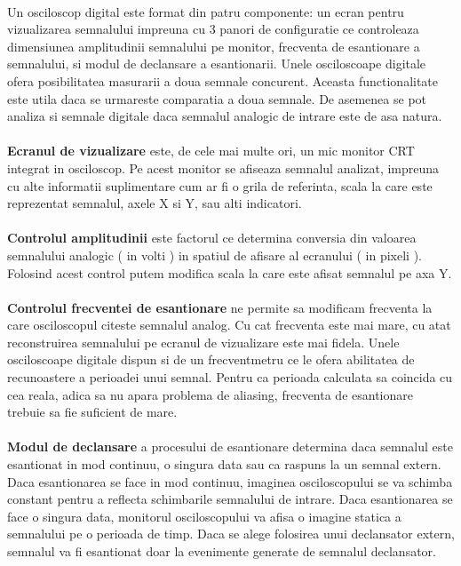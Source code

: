 \paragraph{}
Un osciloscop digital este format din patru componente: un ecran pentru vizualizarea semnalului impreuna cu 3 panori de configuratie ce controleaza dimensiunea amplitudinii semnalului pe monitor, frecventa de esantionare a semnalului, si modul de declansare a esantionarii. Unele osciloscoape digitale ofera posibilitatea masurarii a doua semnale concurent. Aceasta functionalitate este utila daca se urmareste comparatia a doua semnale. De asemenea se pot analiza si semnale digitale daca semnalul analogic de intrare este de asa natura.

\paragraph{}
{\bf Ecranul de vizualizare} este, de cele mai multe ori, un mic monitor CRT integrat in osciloscop. Pe acest monitor se afiseaza semnalul analizat, impreuna cu alte informatii suplimentare cum ar fi o grila de referinta, scala la care este reprezentat semnalul, axele X si Y, sau alti indicatori.

\paragraph{}
{\bf Controlul amplitudinii} este factorul ce determina conversia din valoarea semnalului analogic ( in volti ) in spatiul de afisare al ecranului ( in pixeli ). Folosind acest control putem modifica scala la care este afisat semnalul pe axa Y.

\paragraph{}
{\bf Controlul frecventei de esantionare} ne permite sa modificam frecventa la care osciloscopul citeste semnalul analog. Cu cat frecventa este mai mare, cu atat reconstruirea semnalului pe ecranul de vizualizare este mai fidela. Unele osciloscoape digitale dispun si de un frecventmetru ce le ofera abilitatea de recunoastere a perioadei unui semnal. Pentru ca perioada calculata sa coincida cu cea reala, adica sa nu apara problema de aliasing, frecventa de esantionare trebuie sa fie suficient de mare.

\paragraph{}
{\bf Modul de declansare} a procesului de esantionare determina daca semnalul este esantionat in mod continuu, o singura data sau ca raspuns la un semnal extern. Daca esantionarea se face in mod continuu, imaginea osciloscopului se va schimba constant pentru a reflecta schimbarile semnalului de intrare. Daca esantionarea se face o singura data, monitorul osciloscopului va afisa o imagine statica a semnalului pe o perioada de timp. Daca se alege folosirea unui declansator extern, semnalul va fi esantionat doar la evenimente generate de semnalul declansator.


